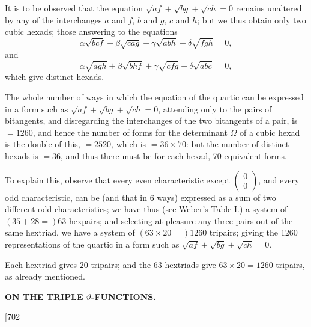 \documentclass[11pt,a4paper]{book}
\begin{document}
It is to be observed that the equation $\sqrt{af} + \sqrt{bg} + \sqrt{ch} = 0$ remains unaltered by any of the interchanges $a$ and $f$, $b$ and $g$, $c$ and $h$; but we thus obtain only two cubic hexads; those answering to the equations
\[
\alpha\sqrt{bcf} + \beta\sqrt{cag} + \gamma\sqrt{abh} + \delta\sqrt{fgh} = 0,
\]
and
\[
\alpha\sqrt{agh} + \beta\sqrt{bhf} + \gamma\sqrt{cfg} + \delta\sqrt{abc} = 0,
\]
which give distinct hexads.

The whole number of ways in which the equation of the quartic can be expressed in a form such as $\sqrt{af} + \sqrt{bg} + \sqrt{ch} = 0$, attending only to the pairs of bitangents, and disregarding the interchanges of the two bitangents of a pair, is $= 1260$, and hence the number of forms for the determinant $\Omega$ of a cubic hexad is the double of this, $= 2520$, which is $= 36 \times 70$: but the number of distinct hexads is $= 36$, and thus there must be for each hexad, 70 equivalent forms.

To explain this, observe that every even characteristic except $\begin{pmatrix} 0 \\ 0 \end{pmatrix}$, and every odd characteristic, can be (and that in 6 ways) expressed as a sum of two different odd characteristics; we have thus (see Weber's Table I.) a system of $(35 + 28 =) 63$ hexpairs; and selecting at pleasure any three pairs out of the same hextriad, we have a system of $(63 \times 20 =) 1260$ tripairs; giving the 1260 representations of the quartic in a form such as $\sqrt{af} + \sqrt{bg} + \sqrt{ch} = 0$.

Each hextriad gives 20 tripairs; and the 63 hextriads give $63 \times 20 = 1260$ tripairs, as already mentioned.
\clearpage


\setlength{\parindent}{1.5em}
\setlength{\parskip}{0pt plus 1pt}

\thispagestyle{empty}
\begin{center}
\large\bfseries ON THE TRIPLE $\vartheta$-FUNCTIONS.\par\vspace{0.5em}
\normalsize\normalfont [702
\end{center}
\end{document}

